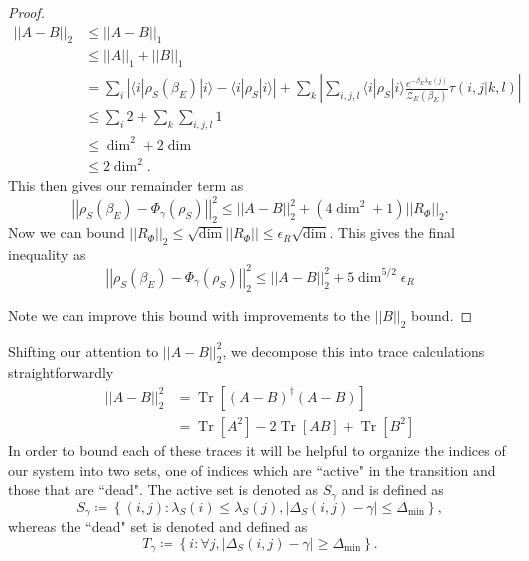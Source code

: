 \documentclass{article}
\newcommand{\ket}[1]{|#1\rangle}
\newcommand{\bra}[1]{\langle #1|}
\newcommand{\brackets}[1]{\left[ #1 \right]}
\newcommand{\abs}[1]{\left| #1 \right|}
\newcommand{\norm}[1]{\left| \left| #1 \right| \right|}
\newcommand{\set}[1]{\left\{ #1 \right\}}
\DeclareMathOperator{\Tr}{Tr}
\newcommand{\trace}[1]{\Tr \brackets{ #1 }}
\newcommand{\partfun}{\mathcal{Z}}
\begin{document}
\begin{proof}
\begin{align}
    \norm{A - B}_2 &\leq \norm{A - B}_1 \\
    &\leq \norm{A}_1 + \norm{B}_1 \\
    &= \sum_{i} \abs{\bra{i}\rho_S(\beta_E) \ket{i} - \bra{i} \rho_S \ket{i}} + \sum_k \abs{\sum_{i,j,l} \bra{i} \rho_S \ket{i} \frac{e^{-\beta_E \lambda_E(j)}}{\partfun_E(\beta_E)} \tau(i,j | k,l)} \\
    &\leq \sum_i 2 + \sum_k \sum_{i,j,l} 1 \\
    &\leq \dim^2 + 2 \dim \\
    &\leq 2 \dim^2.
\end{align}
This then gives our remainder term as
\begin{equation}
    \norm{\rho_S(\beta_E) - \Phi_{\gamma}(\rho_S)}_2^2 \leq \norm{A - B}_2^2 + (4 \dim^2 + 1) \norm{R_{\Phi}}_2.
\end{equation}
Now we can bound $\norm{R_{\Phi}}_2 \leq \sqrt{\dim} \norm{R_{\Phi}} \leq \epsilon_{R} \sqrt{\dim}$. This gives the final inequality as
\begin{equation}
    \norm{\rho_S(\beta_E) - \Phi_{\gamma}(\rho_S)}_2^2 \leq \norm{A - B}_2^2 + 5 \dim^{5/2} \epsilon_{R}
\end{equation}

Note we can improve this bound with improvements to the $\norm{B}_2$ bound. 
\end{proof}


Shifting our attention to $\norm{A-B}_2^2$, we decompose this into trace calculations straightforwardly
\begin{align}
    \norm{A-B}_2^2 &= \trace{(A-B)^\dagger (A-B)} \\
    &= \trace{A^2} - 2 \trace{AB} + \trace{B^2}
\end{align}
In order to bound each of these traces it will be helpful to organize the indices of our system into two sets, one of indices which are ``active" in the transition and those that are ``dead". The active set is denoted as $S_{\gamma}$ and is defined as
\begin{equation}
    S_{\gamma} \coloneqq \set{(i,j) : \lambda_S(i) \leq \lambda_S(j), |\Delta_S(i,j) - \gamma| \leq \Delta_{\min}},
\end{equation}
whereas the ``dead" set is denoted and defined as
\begin{equation}
T_{\gamma} \coloneqq \set{i : \forall j, |\Delta_S(i,j) - \gamma| \geq \Delta_{\min}}. 
\end{equation}
\end{document}
